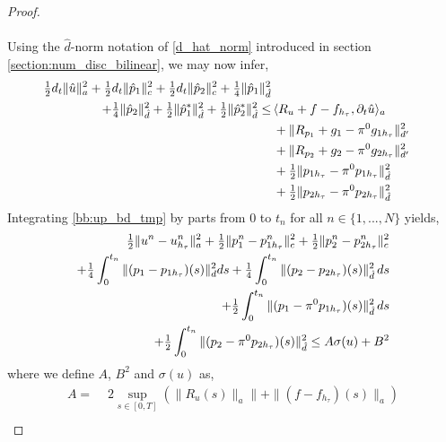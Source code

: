 \begin{proof}
\\
\\
Using the $\hat{d}$-norm notation of \eqref{d_hat_norm} introduced in section \ref{section:num_disc_bilinear}, we may now infer,
\begin{align} \label{bb:up_bd_tmp}
\tfrac{1}{2} d_t \|\hat{u}\|_a^2 + \tfrac{1}{2} d_t \|\hat{p}_1\|_c^2 + \tfrac{1}{2} d_t \|\hat{p}_2\|_c^2 + \tfrac{1}{4}\|\hat{p}_1\|_{\hat{d}}^2 \\
+ \tfrac{1}{4}\|\hat{p}_2\|_{\hat{d}}^2 + \tfrac{1}{2} \|\hat{p}^*_1\|_{\hat{d}}^2 + \tfrac{1}{2} \|\hat{p}^*_2\|_{\hat{d}}^2 \leq & \, \langle R_u + f - f_{h_\tau}, \partial_t \hat{u} \rangle_a \notag \\
& \, + \|R_{p_1} + g_1 - \pi^0g_{1h_\tau}\|_{d'}^2 \notag \\
& \, + \|R_{p_2} + g_2 - \pi^0g_{2h_\tau}\|_{d'}^2 \notag \\
& \, + \tfrac{1}{2} \|p_{1h_\tau} - \pi^0p_{1h_\tau}\|_{\hat{d}}^2 \notag \\
& \, + \tfrac{1}{2} \|p_{2h_\tau} - \pi^0p_{2h_\tau}\|_{\hat{d}}^2 \notag 
\end{align}
Integrating \eqref{bb:up_bd_tmp} by parts from $0$ to $t_n$ for all $n \in \{1,...,N \}$ yields,
\begin{align} \label{bb:up_bd4}
\tfrac{1}{2}\|u^n - u^n_{h_\tau} \|^2_a + \tfrac{1}{2}\|p_1^n - p^n_{1h_\tau} \|^2_c
+ \tfrac{1}{2}\|p_2^n - p^n_{2h_\tau} \|^2_c \\ 
+ \tfrac{1}{4}\int_0^{t_n} \|(p_1 - p_{1h_\tau})(s) \|^2_d ds + \tfrac{1}{4}\int_0^{t_n} \|(p_2 - p_{2h_\tau})(s) \|^2_{\hat{d}} \, ds \notag \\
+ \tfrac{1}{2}\int_0^{t_n} \|(p_1 - \pi^0p_{1h_\tau})(s) \|^2_{\hat{d}} \, ds \notag \\
+ \tfrac{1}{2}\int_0^{t_n} \|(p_2 - \pi^0p_{2h_\tau})(s) \|^2_{\hat{d}} \leq A\sigma(u) + B^2 \notag
\end{align}
where we define $A$, $B^2$ and $\sigma(u)$ as,
\\
\begin{align*}
A = & \, \, 2 \sup_{s \in [0,T]} \left(\| R_u(s)\|_a\|  + \| (f - f_{h_\tau})(s)\|_a\right) \\

\end{align*}
\end{proof}
